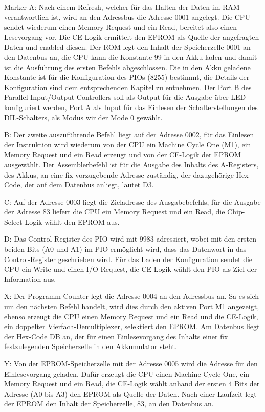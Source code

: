 Marker A: Nach einem Refresh, welcher für das Halten der Daten im RAM verantwortlich ist, wird an den Adressbus die Adresse 0001 angelegt. Die CPU sendet wiederum einen Memory Request und ein Read, bereitet also einen Lesevorgang vor. Die CE-Logik ermittelt den EPROM als Quelle der angefragten Daten und enabled diesen. Der ROM legt den Inhalt der Speicherzelle 0001 an den Datenbus an, die CPU kann die Konstante 99 in den Akku laden und damit ist die Ausführung des ersten Befehls abgeschlossen. Die in den Akku geladene Konstante ist für die Konfiguration des PIOs (8255) bestimmt, die Details der Konfiguration sind dem entsprechenden Kapitel zu entnehmen. Der Port B des Parallel Input/Output Controllers soll als Output für die Ausgabe über LED konfiguriert werden, Port A als Input für das Einlesen der Schalterstellungen des DIL-Schalters, als Modus wir der Mode 0 gewählt.

B: Der zweite auszuführende Befehl liegt auf der Adresse 0002, für das Einlesen der Instruktion wird wiederum von der CPU ein Machine Cycle One (M1), ein Memory Request und ein Read erzeugt und von der CE-Logik der EPROM ausgewählt. Der Assemblerbefehl ist für die Ausgabe des Inhalts des A-Registers, des Akkus, an eine fix vorzugebende Adresse zuständig, der dazugehörige Hex-Code, der auf dem Datenbus anliegt, lautet D3.

C: Auf der Adresse 0003 liegt die Zieladresse des Ausgabebefehls, für die Ausgabe der Adresse 83 liefert die CPU ein Memory Request und ein Read, die Chip-Select-Logik wählt den EPROM aus.

D: Das Control Register des PIO wird mit 9983 adressiert, wobei mit den ersten beiden Bits (A0 und A1) im PIO ermöglicht wird, dass das Datenwort in das Control-Register geschrieben wird. Für das Laden der Konfiguration sendet die CPU ein Write und einen I/O-Request, die CE-Logik wählt den PIO als Ziel der Information aus.

X: Der Programm Counter legt die Adresse 0004 an den Adressbus an. Sa es sich um den nächsten Befehl handelt, wird dies durch den aktiven Port M1 angezeigt, ebenso erzeugt die CPU einen Memory Request und ein Read und die CE-Logik, ein doppelter Vierfach-Demultiplexer, selektiert den EPROM. Am Datenbus liegt der Hex-Code DB an, der für einen Einlesevorgang des Inhalts einer fix festzulegenden Speicherzelle in den Akkumulator steht.

Y: Von der EPROM-Speicherzelle mit der Adresse 0005 wird die Adresse für den Einlesevorgang geladen. Dafür erzeugt die CPU einen Machine Cycle One, ein Memory Request und ein Read, die CE-Logik wählt anhand der ersten 4 Bits der Adresse (A0 bis A3) den EPROM als Quelle der Daten. Nach einer Laufzeit legt der EPROM den Inhalt der Speicherzelle, 83, an den Datenbus an.

